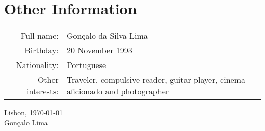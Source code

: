 \documentclass[a4paper,11pt]{article} %
\begin{document}


\section[Other Information]{\faInfoCircle \hspace{3pt} Other Information}

\begin{tabular}{rp{13cm}}
 Full name: & Gonçalo da Silva Lima \\
 Birthday: & 20 November 1993 \\
 Nationality: & Portuguese	\\
 Other interests:	& Traveler, compulsive reader, guitar-player, cinema aficionado and photographer \\
\end{tabular}

\vspace{2cm}
\begin{flushright}
\normalsize Lisbon, \today \\
\normalsize Gonçalo Lima \\
\end{flushright}









\end{document}
